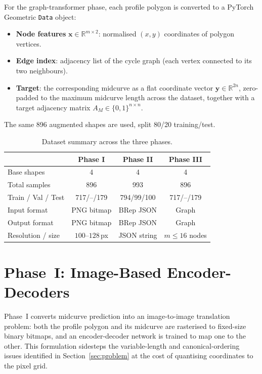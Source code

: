 \documentclass[journal]{IEEEtran}
\begin{document}
For the graph-transformer phase, each profile polygon is converted to a
PyTorch Geometric \texttt{Data} object:
\begin{itemize}
  \item \textbf{Node features} $\mathbf{x} \in \mathbb{R}^{m \times 2}$:
        normalised $(x, y)$ coordinates of polygon vertices.
  \item \textbf{Edge index}: adjacency list of the cycle graph
        (each vertex connected to its two neighbours).
  \item \textbf{Target}: the corresponding midcurve as a flat coordinate
        vector $\mathbf{y} \in \mathbb{R}^{2n}$, zero-padded to the maximum
        midcurve length across the dataset, together with a target adjacency
        matrix $A_M \in \{0,1\}^{n \times n}$.
\end{itemize}
The same 896 augmented shapes are used, split 80/20 training/test.

\begin{table}[!t]
\centering
\caption{Dataset summary across the three phases.}
\label{tab:dataset}
\begin{tabular}{@{}lccc@{}}
\toprule
 & \textbf{Phase I} & \textbf{Phase II} & \textbf{Phase III} \\
\midrule
Base shapes          & 4       & 4       & 4       \\
Total samples        & 896     & 993     & 896     \\
Train / Val / Test   & 717/--/179 & 794/99/100 & 717/--/179 \\
Input format         & PNG bitmap & BRep JSON & Graph \\
Output format        & PNG bitmap & BRep JSON & Graph \\
Resolution / size    & $100$--$128$\,px & JSON string & $m \leq 16$ nodes \\
\bottomrule
\end{tabular}
\end{table}

\section{Phase~I: Image-Based Encoder-Decoders}
\label{sec:phase1}

Phase~I converts midcurve prediction into an image-to-image translation
problem: both the profile polygon and its midcurve are rasterised to
fixed-size binary bitmaps, and an encoder-decoder network is trained to map
one to the other.  This formulation sidesteps the variable-length and
canonical-ordering issues identified in Section~\ref{sec:problem} at the cost
of quantising coordinates to the pixel grid.
\end{document}
